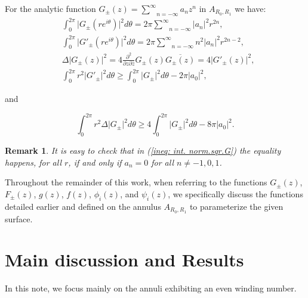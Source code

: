 \documentclass[11pt]{amsart}
\newtheorem{rem}[thm]{\bf{Remark}}
\numberwithin{equation}{section}
\theoremstyle{theorem}
\theoremstyle{definition}
\numberwithin{equation}{section}
\begin{document}
For the analytic function $G_{\pm}(z) = \underset{n=-\infty }{\overset{\infty}{\sum}} a_n z^n$ in $A_{R_0,R_1}$ we have: \\
\begin{equation}
\nonumber
\begin{split}
& \int_{0}^{2\pi} \vert G_{\pm}(re^{i\theta} )\vert^2 d\theta = 2\pi \underset{n=-\infty }{\overset{\infty}{\sum}} \vert a_n \vert^2 r^{2n} , \\
& \int_{0}^{2\pi} \vert G'_{\pm}(re^{i\theta} )\vert^2 d\theta = 2\pi \underset{n=-\infty }{\overset{\infty}{\sum}} n^2 \vert  a_n \vert^2 r^{2n-2} , \\
& \Delta \vert G_{\pm}(z)\vert^2 =4\frac{\partial^2}{\partial z\partial \bar{z}} G_{\pm}(z) \overline{G_{\pm}(z)} = 4\vert G'_{\pm}(z)\vert^2 ,\\
& \int_{0}^{2\pi} r^2 \vert G'_{\pm} \vert^2 d\theta \geq \int_{0}^{2\pi} \vert G_{\pm}\vert^2 d\theta -2\pi \vert a_0\vert^2 ,
\end{split}
\end{equation}

and

\begin{equation} \label{ineq: int. norm.sqr.G}
    \int_{0}^{2\pi} r^2 \Delta \vert G_{\pm}\vert^2 d\theta \geq 4 \int_{0}^{2\pi} \vert G_{\pm}\vert^2 d\theta -8\pi \vert a_0\vert^2.
\end{equation}

\begin{rem}
   \rm It is easy to check that in (\ref{ineq: int. norm.sqr.G}) the equality happens, for all $r$, if and only if $a_n=0$ for all $n\neq -1,0,1$.
\end{rem}

 Throughout the remainder of this work, when referring to the functions $G_{\pm}(z)$, $F_{\pm}(z)$, $g(z)$, $f(z)$, $\phi_i(z)$, and $\psi_i(z)$, we specifically discuss the functions detailed earlier and defined on the annulus $A_{R_0,R_1}$ to parameterize the given surface.

 
\section{Main discussion and Results}
 In this note, we focus mainly on the annuli exhibiting an even winding number. 
\end{document}
